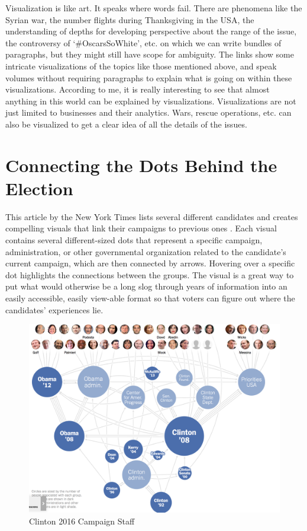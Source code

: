 \documentclass[]{book}
\theoremstyle{definition}
\theoremstyle{definition}
\theoremstyle{definition}
\theoremstyle{remark}
\begin{document}
Visualization is like art. It speaks where words fail. There are
phenomena like the Syrian war, the number flights during Thanksgiving in
the USA, the understanding of depths for developing perspective about
the range of the issue, the controversy of `\#OscarsSoWhite', etc. on
which we can write bundles of paragraphs, but they might still have
scope for ambiguity. The links show some intricate visualizations of the
topics like those mentioned above, and speak volumes without requiring
paragraphs to explain what is going on within these visualizations.
According to me, it is really interesting to see that almost anything in
this world can be explained by visualizations. Visualizations are not
just limited to businesses and their analytics. Wars, rescue operations,
etc. can also be visualized to get a clear idea of all the details of
the issues.

\section{Connecting the Dots Behind the
Election}\label{connecting-the-dots-behind-the-election}

This article by the New York Times lists several different candidates
and creates compelling visuals that link their campaigns to previous
ones \citep{campaign_staff}\citep{cool_data}. Each visual contains
several different-sized dots that represent a specific campaign,
administration, or other governmental organization related to the
candidate's current campaign, which are then connected by arrows.
Hovering over a specific dot highlights the connections between the
groups. The visual is a great way to put what would otherwise be a long
slog through years of information into an easily accessible, easily
view-able format so that voters can figure out where the candidates'
experiences lie.

\begin{figure}
\centering
\includegraphics{images/clinton_campaign.png}
\caption{Clinton 2016 Campaign Staff}
\end{figure}
\end{document}
